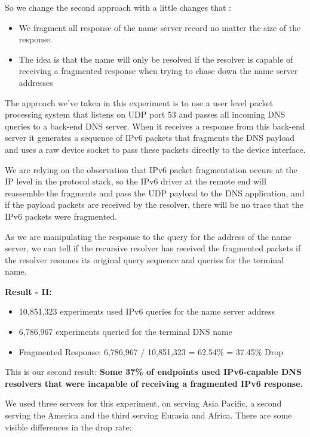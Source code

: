 So we change the second approach with a little changes that :

\begin{itemize}
  \item We fragment all response of the name server record no matter the size 
  of the response.
  \item The	idea is	that the name will only	be resolved	if the resolver 
  is capable of	receiving a fragmented response when trying to chase down the 
  name server addresses
\end{itemize}

The approach we’ve taken in this experiment is to use a user level packet processing system that listens on UDP port 53 and passes all incoming DNS queries to a back-end DNS server. When it receives a response from this back-end server it generates a sequence of IPv6 packets that fragments the DNS payload and uses a raw device socket to pass these packets directly to the device interface.

We are relying on the observation that IPv6 packet fragmentation occurs at the IP level in the protocol stack, so the IPv6 driver at the remote end will reassemble the fragments and pass the UDP payload to the DNS application, and if the payload packets are received by the resolver, there will be no trace that the IPv6 packets were fragmented.

As we are manipulating the response to the query for the address of the name server, we can tell if the recursive resolver has received the fragmented packets if the resolver resumes its original query sequence and queries for the terminal name.


\textbf{Result - II:}

\begin{itemize}
  \item 10,851,323 experiments used IPv6 queries for the name server address
  \item 6,786,967 experiments queried for the terminal DNS name
  \item Fragmented Response: 6,786,967 / 10,851,323 = 62.54\% = 37.45\% Drop
\end{itemize}

This is our second result: \textbf{Some 37\% of endpoints used IPv6-capable DNS resolvers that were incapable of receiving a fragmented IPv6 response.}

We used three servers for this experiment, on serving Asia Pacific, a second serving the America and the third serving Eurasia and Africa. There are some visible differences in the drop rate:

